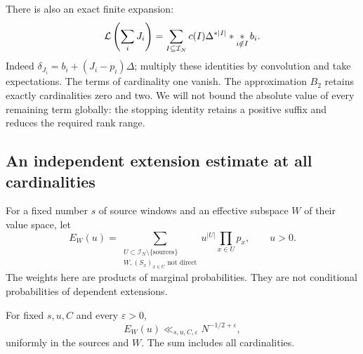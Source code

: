 There is also an exact finite expansion:
\begin{equation}
 \mathcal L\left(\sum_iJ_i\right)
   =\sum_{I\subseteq\mathcal I_N}c(I)\Delta^{*|I|}*
                                \mathop{*}_{i\notin I}b_i.
 \label{p13:transfer:exact-expansion}
\end{equation}
Indeed $\delta_{J_i}=b_i+(J_i-p_i)\Delta$; multiply these identities
by convolution and take expectations. The terms of cardinality one
vanish. The approximation $B_2$ retains exactly cardinalities zero and
two. We will not bound the absolute value of every remaining term
globally: the stopping identity retains a positive suffix and reduces
the required rank range.

\subsection{An independent extension estimate at all cardinalities}

For a fixed number $s$ of source windows and an effective subspace $W$
of their value space, let
\[
 E_W(u)=\sum_{\substack{U\subset\mathcal I_N\setminus\{\text{sources}\}\\
                      W,(S_x)_{x\in U}\text{ not direct}}}
                 u^{|U|}\prod_{x\in U}p_x,
 \qquad u>0.
\]
The weights here are products of marginal probabilities. They are not
conditional probabilities of dependent extensions.

\begin{lemma}
\label{p13:transfer:independent-deficit}
For fixed $s,u,C$ and every $\varepsilon>0$,
\begin{equation}
 E_W(u)\ll_{s,u,C,\varepsilon}N^{-1/2+\varepsilon},
 \label{p13:transfer:independent-bound}
\end{equation}
uniformly in the sources and $W$. The sum includes all cardinalities.
\end{lemma}

